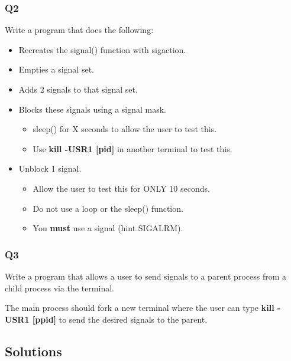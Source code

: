 \documentclass{article}
\begin{document}
\subsubsection{Q2}
Write a program that does the following:
\begin{itemize}
    \item Recreates the signal() function with sigaction.
    \item Empties a signal set.
    \item Adds 2 signals to that signal set.
    \item Blocks these signals using a signal mask.
        \begin{itemize}
            \item sleep() for X seconds to allow the user to test this.
            \item Use \textbf{kill -USR1 [pid]} in another terminal to test this.
        \end{itemize}
    \item Unblock 1 signal.
        \begin{itemize}
            \item Allow the user to test this for ONLY 10 seconds.
            \item Do not use a loop or the sleep() function.
            \item You \textbf{must} use a signal (hint SIGALRM).
        \end{itemize}
\end{itemize}
\clearpage
\subsubsection{Q3}
Write a program that allows a user to send signals to a parent process from a child
process via the terminal.

The main process should fork a new terminal where the user can type \textbf{kill -USR1 [ppid]}
to send the desired signals to the parent.

\subsection{Solutions}
\end{document}
